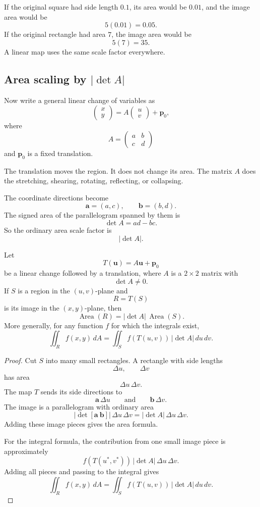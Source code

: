 If the original square had side length \(0.1\), its area would be \(0.01\), and the image
area would be
\[
    5(0.01)=0.05.
\]
If the original rectangle had area \(7\), the image area would be
\[
    5(7)=35.
\]
A linear map uses the same scale factor everywhere.

\subsection{Area scaling by \texorpdfstring{\(|\det A|\)}{|det A|}}

Now write a general linear change of variables as
\[
    \begin{pmatrix}
    x\\y
    \end{pmatrix}
    =
    A
    \begin{pmatrix}
    u\\v
    \end{pmatrix}
    +
    \mathbf p_0,
\]
where
\[
    A=
    \begin{pmatrix}
        a&b\\
        c&d
    \end{pmatrix}
\]
and \(\mathbf p_0\) is a fixed translation.

The translation moves the region.  It does not change its area.  The matrix \(A\) does
the stretching, shearing, rotating, reflecting, or collapsing.

The coordinate directions become
\[
    \mathbf a=(a,c),
    \qquad
    \mathbf b=(b,d).
\]
The signed area of the parallelogram spanned by them is
\[
    \det A=ad-bc.
\]
So the ordinary area scale factor is
\[
    |\det A|.
\]

\begin{theorem}
Let
\[
    T(\mathbf u)=A\mathbf u+\mathbf p_0
\]
be a linear change followed by a translation, where \(A\) is a \(2\times2\) matrix with
\[
    \det A\ne0.
\]
If \(S\) is a region in the \((u,v)\)-plane and
\[
    R=T(S)
\]
is its image in the \((x,y)\)-plane, then
\[
\boxed{
    \operatorname{Area}(R)=|\det A|\,\operatorname{Area}(S).
}
\]
More generally, for any function \(f\) for which the integrals exist,
\[
\boxed{
    \iint_R f(x,y)\,dA
    =
    \iint_S f(T(u,v))\,|\det A|\,du\,dv.
}
\]
\end{theorem}

\begin{proof}
Cut \(S\) into many small rectangles.  A rectangle with side lengths
\[
    \Delta u,\qquad \Delta v
\]
has area
\[
    \Delta u\,\Delta v.
\]
The map \(T\) sends its side directions to
\[
    \mathbf a\,\Delta u
    \qquad\text{and}\qquad
    \mathbf b\,\Delta v.
\]
The image is a parallelogram with ordinary area
\[
    |\det[\mathbf a\ \mathbf b]|\,\Delta u\,\Delta v
    =
    |\det A|\,\Delta u\,\Delta v.
\]
Adding these image pieces gives the area formula.

For the integral formula, the contribution from one small image piece is approximately
\[
    f(T(u^*,v^*))\,|\det A|\,\Delta u\,\Delta v.
\]
Adding all pieces and passing to the integral gives
\[
    \iint_R f(x,y)\,dA
    =
    \iint_S f(T(u,v))\,|\det A|\,du\,dv.
\]
\end{proof}

